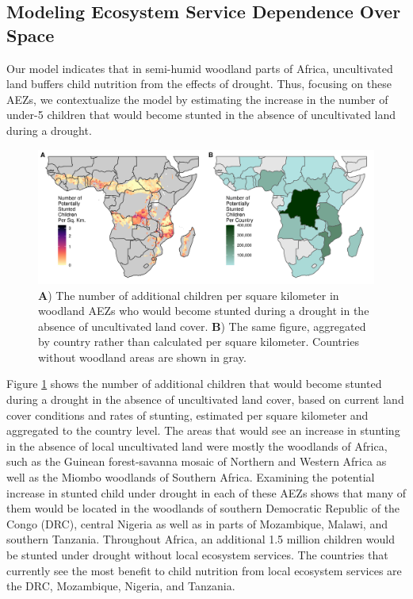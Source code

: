\documentclass{article}
\begin{document}
\subsection{Modeling Ecosystem Service Dependence Over Space}
Our model indicates that in semi-humid woodland parts of Africa, uncultivated land buffers child nutrition from the effects of drought.  Thus, focusing on these AEZs, we contextualize the model by estimating the increase in the number of under-5 children that would become stunted in the absence of uncultivated land during a drought.

\begin{figure}[h!]
	\begin{center}
		\includegraphics[width=\linewidth]{AfricaEffect.png}
    \caption{\textbf{A}) The number of additional children per square kilometer in woodland AEZs who would become stunted during a drought in the absence of uncultivated land cover.  \textbf{B}) The same figure, aggregated by country rather than calculated per square kilometer.  Countries without woodland areas are shown in gray.}
		\label{fig:AfricaEffect}
	\end{center}
\end{figure}

Figure \ref{fig:AfricaEffect} shows the number of additional children that would become stunted during a drought in the absence of uncultivated land cover, based on current land cover conditions and rates of stunting, estimated per square kilometer and aggregated to the country level.  The areas that would see an increase in stunting in the absence of local uncultivated land were mostly the woodlands of Africa, such as the Guinean forest-savanna mosaic of Northern and Western Africa as well as the Miombo woodlands of Southern Africa. Examining the potential increase in stunted child under drought in each of these AEZs shows that many of them would be located in the woodlands of southern Democratic Republic of the Congo (DRC), central Nigeria as well as in parts of Mozambique, Malawi, and southern Tanzania.  Throughout Africa, an additional 1.5 million children would be stunted under drought without local ecosystem services.  The countries that currently see the most benefit to child nutrition from local ecosystem services are the DRC, Mozambique, Nigeria, and Tanzania.
\end{document}
